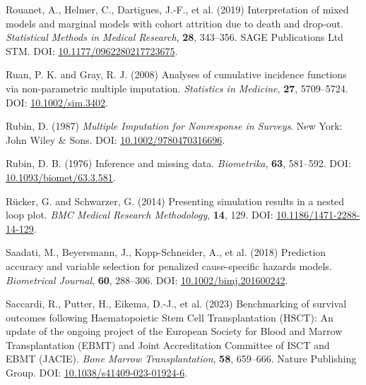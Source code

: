 \documentclass[
  letterpaper,
  DIV=11,
  numbers=noendperiod]{scrreprt}
\newlength{\cslhangindent}
\newenvironment{CSLReferences}[2] %
 {\begin{list}{}{%
  \setlength{\itemindent}{0pt}
  \setlength{\leftmargin}{0pt}
  \setlength{\parsep}{0pt}
  \ifodd #1
   \setlength{\leftmargin}{\cslhangindent}
   \setlength{\itemindent}{-1\cslhangindent}
  \fi
  \setlength{\itemsep}{#2\baselineskip}}}
 {\end{list}}
\begin{document}
\begin{CSLReferences}{1}{1}
Rouanet, A., Helmer, C., Dartigues, J.-F., et al. (2019) Interpretation
of mixed models and marginal models with cohort attrition due to death
and drop-out. \emph{Statistical Methods in Medical Research},
\textbf{28}, 343--356. SAGE Publications Ltd STM. DOI:
\href{https://doi.org/10.1177/0962280217723675}{10.1177/0962280217723675}.

Ruan, P. K. and Gray, R. J. (2008) Analyses of cumulative incidence
functions via non-parametric multiple imputation. \emph{Statistics in
Medicine}, \textbf{27}, 5709--5724. DOI:
\href{https://doi.org/10.1002/sim.3402}{10.1002/sim.3402}.

Rubin, D. (1987) \emph{Multiple Imputation for Nonresponse in Surveys}.
New York: John Wiley \& Sons. DOI:
\href{https://doi.org/10.1002/9780470316696}{10.1002/9780470316696}.

Rubin, D. B. (1976) Inference and missing data. \emph{Biometrika},
\textbf{63}, 581--592. DOI:
\href{https://doi.org/10.1093/biomet/63.3.581}{10.1093/biomet/63.3.581}.

Rücker, G. and Schwarzer, G. (2014) Presenting simulation results in a
nested loop plot. \emph{BMC Medical Research Methodology}, \textbf{14},
129. DOI:
\href{https://doi.org/10.1186/1471-2288-14-129}{10.1186/1471-2288-14-129}.

Saadati, M., Beyersmann, J., Kopp-Schneider, A., et al. (2018)
Prediction accuracy and variable selection for penalized cause-specific
hazards models. \emph{Biometrical Journal}, \textbf{60}, 288--306. DOI:
\href{https://doi.org/10.1002/bimj.201600242}{10.1002/bimj.201600242}.

Saccardi, R., Putter, H., Eikema, D.-J., et al. (2023) Benchmarking of
survival outcomes following {Haematopoietic Stem Cell Transplantation}
({HSCT}): An update of the ongoing project of the {European Society} for
{Blood} and {Marrow Transplantation} ({EBMT}) and {Joint Accreditation
Committee} of {ISCT} and {EBMT} ({JACIE}). \emph{Bone Marrow
Transplantation}, \textbf{58}, 659--666. Nature Publishing Group. DOI:
\href{https://doi.org/10.1038/s41409-023-01924-6}{10.1038/s41409-023-01924-6}.


\end{CSLReferences}
\end{document}
